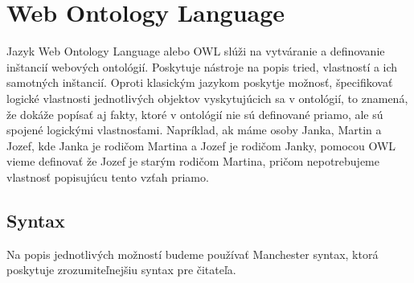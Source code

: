 \documentclass[12pt, a4paper, oneside]{book}
\begin{document}

\section{Web Ontology Language}
Jazyk Web Ontology Language alebo OWL slúži na vytváranie a definovanie inštancií webových ontológií. Poskytuje nástroje na popis tried, vlastností a ich samotných inštancií. Oproti klasickým jazykom poskytje možnosť, špecifikovať logické vlastnosti jednotlivých objektov vyskytujúcich sa v ontológií, to znamená, že dokáže popísať aj fakty, ktoré v ontológií nie sú definované priamo, ale sú spojené logickými vlastnosťami. Napríklad, ak máme osoby Janka, Martin a Jozef, kde Janka je rodičom Martina a Jozef je rodičom Janky, pomocou OWL vieme definovať že Jozef je starým rodičom Martina, pričom nepotrebujeme vlastnosť popisujúcu tento vzťah priamo.













\subsection{Syntax}
Na popis jednotlivých možností budeme používať Manchester syntax, ktorá poskytuje zrozumiteľnejšiu syntax pre čitateľa.
\end{document}
